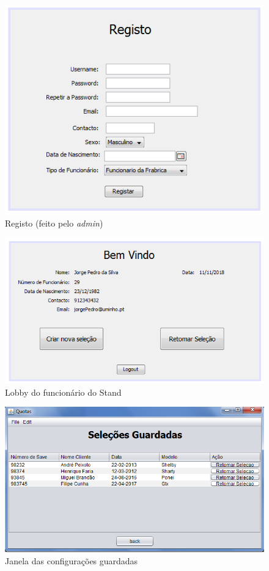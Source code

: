\begin{figure}
    \centering
    \includegraphics[width=\textwidth]{analise_de_requisitos/img/registo.png}
    \caption{Registo (feito pelo \textit{admin})}
\end{figure}

\begin{figure}
    \centering
    \includegraphics[width=\textwidth]{analise_de_requisitos/img/lobby_funcionario.png}
    \caption{Lobby do funcionário do Stand}
\end{figure}

\begin{figure}
    \centering
    \includegraphics[width=\textwidth]{analise_de_requisitos/img/configs_guardadas.png}
    \caption{Janela das configurações guardadas}
\end{figure}

